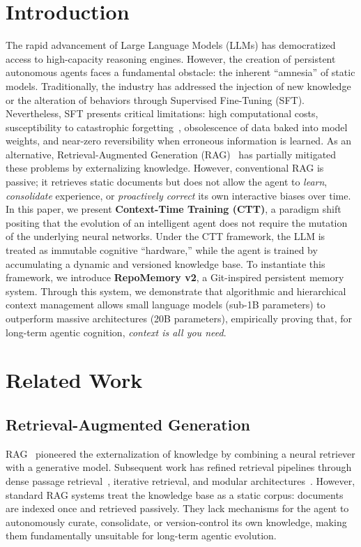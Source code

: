 \documentclass[conference]{IEEEtran}
\begin{document}
\section{Introduction}
The rapid advancement of Large Language Models (LLMs) has democratized access to high-capacity reasoning engines. However, the creation of persistent autonomous agents faces a fundamental obstacle: the inherent ``amnesia'' of static models. Traditionally, the industry has addressed the injection of new knowledge or the alteration of behaviors through Supervised Fine-Tuning (SFT). Nevertheless, SFT presents critical limitations: high computational costs, susceptibility to catastrophic forgetting~\cite{kirkpatrick2017overcoming}, obsolescence of data baked into model weights, and near-zero reversibility when erroneous information is learned.
As an alternative, Retrieval-Augmented Generation (RAG)~\cite{lewis2020retrieval} has partially mitigated these problems by externalizing knowledge. However, conventional RAG is passive; it retrieves static documents but does not allow the agent to \emph{learn}, \emph{consolidate} experience, or \emph{proactively correct} its own interactive biases over time.
In this paper, we present \textbf{Context-Time Training (CTT)}, a paradigm shift positing that the evolution of an intelligent agent does not require the mutation of the underlying neural networks. Under the CTT framework, the LLM is treated as immutable cognitive ``hardware,'' while the agent is trained by accumulating a dynamic and versioned knowledge base. To instantiate this framework, we introduce \textbf{RepoMemory v2}, a Git-inspired persistent memory system. Through this system, we demonstrate that algorithmic and hierarchical context management allows small language models (sub-1B parameters) to outperform massive architectures (20B parameters), empirically proving that, for long-term agentic cognition, \emph{context is all you need}.
\section{Related Work}
\subsection{Retrieval-Augmented Generation}
RAG~\cite{lewis2020retrieval} pioneered the externalization of knowledge by combining a neural retriever with a generative model. Subsequent work has refined retrieval pipelines through dense passage retrieval~\cite{karpukhin2020dense}, iterative retrieval, and modular architectures~\cite{gao2023retrieval}. However, standard RAG systems treat the knowledge base as a static corpus: documents are indexed once and retrieved passively. They lack mechanisms for the agent to autonomously curate, consolidate, or version-control its own knowledge, making them fundamentally unsuitable for long-term agentic evolution.
\end{document}
